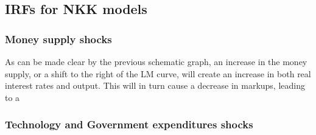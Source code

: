 \documentclass[12pt]{report}
\begin{document}
\subsection{IRFs for NKK models}

\subsubsection{Money supply shocks}

As can be made clear by the previous schematic graph, an increase in the money supply, or a shift to the right of the LM curve, will create an increase in both real interest rates and output. This will in turn cause a decrease in markups, leading to a


\subsubsection{Technology and Government expenditures shocks}
\end{document}
